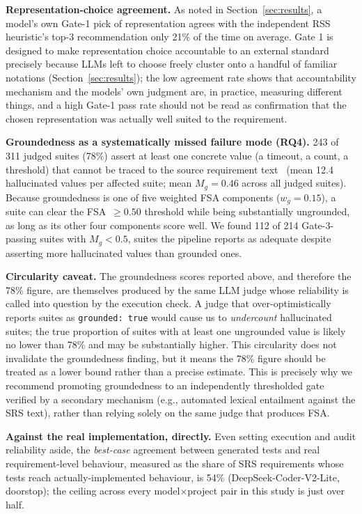\documentclass[conference]{IEEEtran}
\begin{document}
\textbf{Representation-choice agreement.} As noted in
Section~\ref{sec:results}, a model's own Gate-1 pick of representation agrees
with the independent RSS heuristic's top-3 recommendation only 21\% of the
time on average. Gate 1 is designed to make representation choice
accountable to an external standard precisely because LLMs left to choose
freely cluster onto a handful of familiar notations
(Section~\ref{sec:results}); the low agreement rate shows that accountability
mechanism and the models' own judgment are, in practice, measuring different
things, and a high Gate-1 pass rate should not be read as confirmation that
the chosen representation was actually well suited to the requirement.

\textbf{Groundedness as a systematically missed failure mode (RQ4).} 243 of
311 judged suites (78\%) assert at least one concrete value (a timeout, a count, a
threshold) that cannot be traced to the source requirement text~\cite{liu2024codehallucination} (mean 12.4
hallucinated values per affected suite; mean $M_g=0.46$ across all judged
suites). Because groundedness is one of five weighted FSA components
($w_g=0.15$), a suite can clear the FSA~$\geq 0.50$ threshold while being
substantially ungrounded, as long as its other four components score well.
We found 112 of 214 Gate-3-passing suites with $M_g<0.5$, suites the
pipeline reports as adequate despite asserting more hallucinated values than
grounded ones.

\textbf{Circularity caveat.} The groundedness scores reported above, and
therefore the 78\% figure, are themselves produced by the same LLM judge
whose reliability is called into question by the execution check. A judge that
over-optimistically reports suites as \texttt{grounded: true} would cause
us to \emph{undercount} hallucinated suites; the true proportion of suites
with at least one ungrounded value is likely no lower than 78\% and may be
substantially higher. This circularity does not invalidate the groundedness
finding, but it means the 78\% figure should be treated as a lower bound
rather than a precise estimate. This is precisely why we recommend promoting
groundedness to an independently thresholded gate verified by a secondary
mechanism (e.g., automated lexical entailment against the SRS text), rather
than relying solely on the same judge that produces FSA.

\textbf{Against the real implementation, directly.} Even setting execution
and audit reliability aside, the \emph{best-case} agreement between generated
tests and real requirement-level behaviour, measured as the share of SRS
requirements whose tests reach actually-implemented behaviour, is 54\%
(DeepSeek-Coder-V2-Lite, doorstop); the ceiling across every
model$\times$project pair in this study is just over half.
\end{document}
